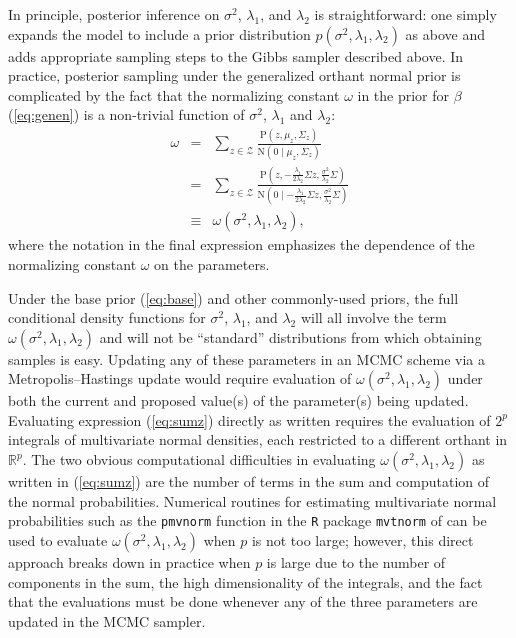 \documentclass[12pt]{article}
\begin{document}
In principle, posterior inference on $\sigma^2$, $\lambda_1$, and $\lambda_2$ is straightforward: one simply expands 
the model to include a prior distribution $p(\sigma^2, \lambda_1, \lambda_2)$ as above and adds appropriate sampling 
steps to the Gibbs sampler described above. 
In practice, posterior
sampling under the generalized orthant normal prior is complicated by the fact that the normalizing constant $\omega$ 
in the prior for $\beta$ (\ref{eq:genen}) is a non-trivial function of $\sigma^2$, $\lambda_1$ and $\lambda_2$:
\begin{eqnarray}
	\omega &=& \sum_{z \in \mathcal{Z}} \frac{\mbox{P}(z, \mu_z, \Sigma_z)}{\mbox{N}(0 \mid \mu_z, \Sigma_z)} 
		\nonumber \\
	&=&\sum_{z \in \mathcal{Z}} \frac{\mbox{P}\left(z, -\frac{\lambda_1}{2\lambda_2}\Sigma z, 
		\frac{\sigma^2}{\lambda_2}\Sigma\right)}{\mbox{N}\left(0 \mid -\frac{\lambda_1}{2\lambda_2}\Sigma z,
		\frac{\sigma^2}{\lambda_2}\Sigma\right)} \label{eq:sumz} \\
	&\equiv& \omega(\sigma^2, \lambda_1, \lambda_2), \nonumber
\end{eqnarray}
where the notation in the final expression emphasizes the dependence of the normalizing constant $\omega$ 
on the parameters.

Under the base prior (\ref{eq:base}) and other commonly-used priors, the full conditional density functions for 
$\sigma^2$, $\lambda_1$, and $\lambda_2$ will all involve the term $\omega(\sigma^2, \lambda_1, \lambda_2)$
and will not be ``standard'' distributions from which obtaining samples is easy. Updating any of these parameters in 
an MCMC scheme via a Metropolis--Hastings update would require evaluation of $\omega(\sigma^2, \lambda_1, \lambda_2)$ 
under both the current and proposed value(s) of the parameter(s) being updated.  Evaluating expression (\ref{eq:sumz}) 
directly as written requires the evaluation of $2^p$ integrals of multivariate normal densities, each restricted to a 
different orthant in $\mathbb{R}^p$.  The two obvious computational difficulties in evaluating 
$\omega(\sigma^2, \lambda_1, \lambda_2)$ as written in (\ref{eq:sumz}) are the number of terms in the sum 
and computation of the normal probabilities.  Numerical routines for estimating multivariate normal 
probabilities such as the \texttt{pmvnorm} function in the \texttt{R} package \texttt{mvtnorm} of \citet{genz:12} 
\citep[see also][]{genz:92, genz:93, genz:09}  can be used to evaluate
$\omega(\sigma^2, \lambda_1, \lambda_2)$ when $p$ is not too large; however, this direct approach breaks down
in practice when $p$ is large due to the number of components in the sum, the high dimensionality of the 
integrals, and the fact that the evaluations must be done whenever any of the three parameters are updated in 
the MCMC sampler.
\end{document}
